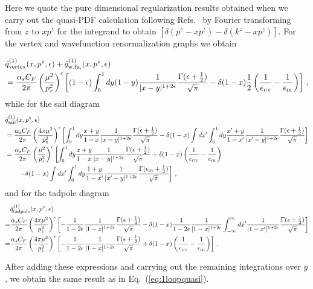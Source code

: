 \documentclass[prd,aps,twocolumn,preprintnumbers,showpacs,nofootinbib,superscriptaddress,notitlepage]{revtex4-1}
\newcommand{\nn}{\nonumber}
\begin{document}
Here we quote the pure dimensional regularization results obtained when we carry out the quasi-PDF calculation following Refs.~\cite{Xiong:2013bka,Stewart:2017tvs} by Fourier transforming from $z$ to $x p^z$ for the integrand to obtain $[\delta(p^z-xp^z)-\delta(k^z-xp^z)]$.
For the vertex and wavefunction renormalization graphs we obtain
\begin{widetext}
	
\begin{align}
	&\tilde{q}^{(1)}_\text{vertex}(x,p^z,\epsilon)
	+ \tilde{q}^{(1)}_\text{w.fn.}(x,p^z,\epsilon)\nn\\
	&={\alpha_sC_F\over 2\pi}\left({\mu^2\over p_z^2}\right)^\epsilon \left[ (1-\epsilon)\int_0^1 dy (1-y){1\over |x-y|^{1+2\epsilon}}{\Gamma(\epsilon+{1\over2})\over\sqrt{\pi}}- \delta(1-x){1\over2} \left({1\over\epsilon_{\mbox{\tiny UV}}} - {1\over \epsilon_{\mbox{\tiny IR}}}\right)\right]\,,
\end{align}
while for the sail diagram
\begin{align}
	&\tilde{q}^{(1)}_\text{sail}(x,p^z,\epsilon) \nn\\
	&= {\alpha_sC_F\over 2\pi}\left({4\pi\mu^2\over p_z^2}\right)^\epsilon\left[\int_0^1 dy {x+y\over 1-x}{1\over |x-y|^{1+2\epsilon}}{\Gamma(\epsilon+{1\over2})\over\sqrt{\pi}}-\delta(1-x)\int dx'\int_0^1 dy {x'+y\over 1-x'}{1\over |x'-y|^{1+2\epsilon}}{\Gamma(\epsilon+{1\over2})\over\sqrt{\pi}} \right]\nonumber\\
	&= {\alpha_sC_F\over 2\pi}\left({\mu^2\over p_z^2}\right)^\epsilon\left[\int_0^1 dy {x+y\over 1-x}{1\over |x-y|^{1+2\epsilon}}{\Gamma(\epsilon+{1\over2})\over\sqrt{\pi}}+\delta(1-x)\left({1\over\epsilon_{\mbox{\tiny UV}}} - {1\over \epsilon_{\mbox{\tiny IR}}}\right)\right.\nn\\
	&\qquad\left. -\delta(1-x)\int dx'\int_0^1 dy {1+y\over 1-x'}{1\over |x'-y|^{1+2\epsilon}}{\Gamma(\epsilon_{\mbox{\tiny IR}}+{1\over2})\over\sqrt{\pi}}\right]\,,
	\end{align}
and for the tadpole diagram
	\begin{align}
	&\tilde{q}^{(1)}_\text{tadpole}(x,p^z,\epsilon)\nn\\
	=& {\alpha_sC_F\over 2\pi}\left({4\pi\mu^2\over p_z^2}\right)^\epsilon \left[-{1\over 1-2\epsilon}{1\over |1-x|^{1+2\epsilon}}{\Gamma(\epsilon+{1\over2})\over\sqrt{\pi}} -\delta(1-x) {1\over 1-2\epsilon}{1\over |1-x|^{1+2\epsilon}}\int_{-\infty}^\infty dx' {1\over |1-x'|^{1+2\epsilon}}{\Gamma(\epsilon+{1\over2})\over\sqrt{\pi}}\right]\nonumber\\
	=& {\alpha_sC_F\over 2\pi}\left({4\pi\mu^2\over p_z^2}\right)^\epsilon \left[-{1\over 1-2\epsilon}{1\over |1-x|^{1+2\epsilon}}{\Gamma(\epsilon+{1\over2})\over\sqrt{\pi}} +\delta(1-x)\left({1\over\epsilon_{\mbox{\tiny UV}}} - {1\over \epsilon_{\mbox{\tiny IR}}}\right) \right]\,.
	\end{align}
	
\end{widetext}
After adding these expressions and carrying out the remaining integrations over $y$, we obtain the same result as in Eq.~(\ref{eq:1loopquasi}).
\end{document}
